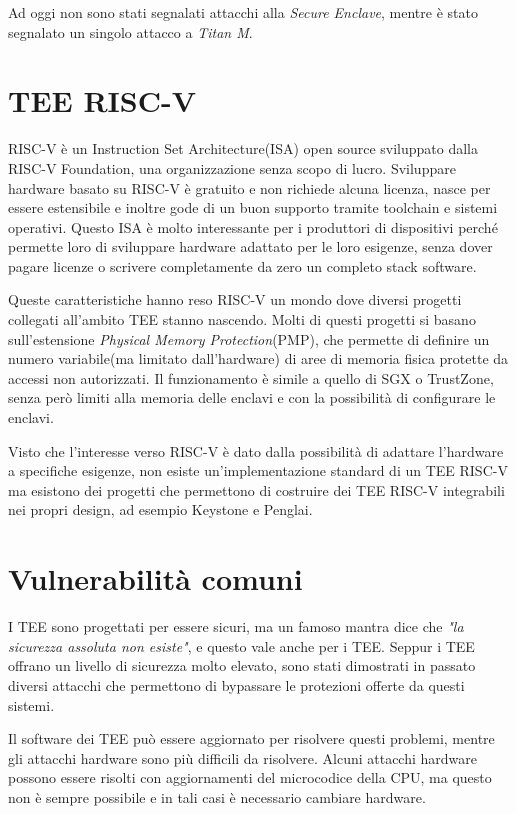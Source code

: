 \documentclass[12pt,italian]{report}
\begin{document}
\bigbreak \noindent

Ad oggi non sono stati segnalati attacchi alla \textit{Secure Enclave},
mentre è stato segnalato un singolo attacco\cite{attack_titanM} a
\textit{Titan M}.

\section{TEE RISC-V}
\label{sec:risc-v}
RISC-V è un Instruction Set Architecture(ISA) open source sviluppato
dalla RISC-V Foundation, una organizzazione senza scopo di lucro.
Sviluppare hardware basato su RISC-V è gratuito e non richiede alcuna
licenza, nasce per essere estensibile e inoltre gode di un buon supporto
tramite toolchain e sistemi operativi.
Questo ISA è molto interessante per i produttori di dispositivi perché
permette loro di sviluppare hardware adattato per le loro esigenze,
senza dover pagare licenze o scrivere completamente da zero un
completo stack software.

Queste caratteristiche hanno reso RISC-V un mondo dove diversi progetti
collegati all'ambito TEE stanno nascendo.
Molti di questi progetti si basano sull'estensione
\textit{Physical Memory Protection}(PMP), che permette di definire un
numero variabile(ma limitato dall'hardware) di aree di memoria fisica
protette da accessi non autorizzati.
Il funzionamento è simile a quello di SGX o TrustZone, senza però limiti
alla memoria delle enclavi e con la possibilità di configurare le enclavi.

Visto che l'interesse verso RISC-V è dato dalla possibilità di adattare
l'hardware a specifiche esigenze, non esiste un'implementazione standard
di un TEE RISC-V ma esistono dei progetti che permettono di costruire
dei TEE RISC-V integrabili nei propri design,
ad esempio Keystone\cite{keystone} e Penglai\cite{penglai}.

\section{Vulnerabilità comuni}
\label{sec:vulnerabilita-comuni}
I TEE sono progettati per essere sicuri, ma un famoso mantra dice che
\textit{"la sicurezza assoluta non esiste"}, e questo vale anche per i TEE.
Seppur i TEE offrano un livello di sicurezza molto elevato, sono stati
dimostrati in passato diversi attacchi che permettono di bypassare
le protezioni offerte da questi sistemi.

Il software dei TEE può essere aggiornato per risolvere questi problemi,
mentre gli attacchi hardware sono più difficili da risolvere.
Alcuni attacchi hardware possono essere risolti con aggiornamenti del
microcodice della CPU, ma questo non è sempre possibile e in tali casi
è necessario cambiare hardware. 
\end{document}
